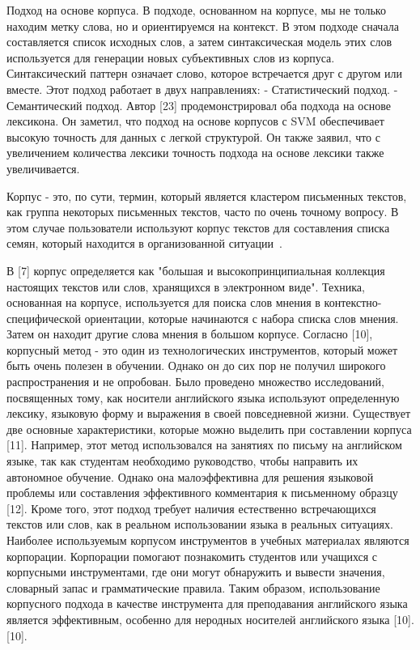 Подход на основе корпуса. В подходе, основанном на корпусе, мы не только находим
метку слова, но и ориентируемся на контекст. В этом подходе сначала составляется
список исходных слов, а затем синтаксическая модель этих слов используется для
генерации новых субъективных слов из корпуса. Синтаксический паттерн означает
слово, которое встречается друг с другом или вместе. Этот подход работает в двух
направлениях:
- Статистический подход.
- Семантический подход.
Автор [23] продемонстрировал оба подхода на основе лексикона. Он заметил, что
подход на основе корпусов с SVM обеспечивает высокую точность для данных с
легкой структурой. Он также заявил, что с увеличением количества лексики
точность подхода на основе лексики также увеличивается.\cite{article16}

Корпус - это, по сути, термин, который является кластером письменных текстов,
как группа некоторых письменных текстов, часто по очень точному вопросу. В этом
случае пользователи используют корпус текстов для составления списка семян,
который находится в организованной ситуации~\cite{article18}.

В [7] корпус определяется как "большая и высокопринципиальная коллекция
настоящих текстов или слов, хранящихся в электронном виде". Техника, основанная
на корпусе, используется для поиска слов мнения в контекстно-специфической
ориентации, которые начинаются с набора списка слов мнения. Затем он находит
другие слова мнения в большом корпусе.
Согласно [10], корпусный метод - это один из технологических инструментов,
который может быть очень полезен в обучении. Однако он до сих пор не получил
широкого распространения и не опробован. Было проведено множество исследований,
посвященных тому, как носители английского языка используют определенную
лексику, языковую форму и выражения в своей повседневной жизни.
Существует две основные характеристики, которые можно выделить при составлении
корпуса [11]. Например, этот метод использовался на занятиях по письму на
английском языке, так как студентам необходимо руководство, чтобы направить их
автономное обучение.
Однако она малоэффективна для решения языковой проблемы или составления
эффективного комментария к письменному образцу [12]. Кроме того, этот подход
требует наличия естественно встречающихся текстов или слов, как в реальном
использовании языка в реальных ситуациях.
Наиболее используемым корпусом инструментов в учебных материалах являются
корпорации.
Корпорации помогают познакомить студентов или учащихся с корпусными
инструментами, где они могут обнаружить и вывести значения, словарный запас и
грамматические правила.
Таким образом, использование корпусного подхода в качестве инструмента для
преподавания английского языка является эффективным, особенно для неродных
носителей английского языка [10].
[10].~\cite{article20}

